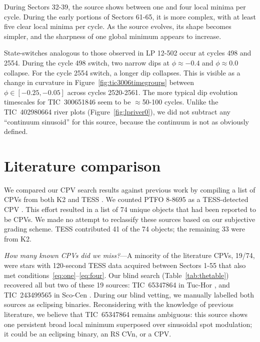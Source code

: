 \documentclass[11pt,twocolumn,tighten]{aastex63}
\begin{document}
During Sectors 32-39, the source shows between one and four local
minima per cycle.  During the early portions of Sectors 61-65, it is
more complex, with at least five clear local minima per
cycle.  As the source evolves, its shape becomes simpler, and the
sharpness of one global minimum appears to increase.

State-switches analogous to those observed in LP 12-502 occur at
cycles 498 and 2554.  During the cycle 498 switch, two narrow dips at
$\phi$$\approx$$-0.4$ and $\phi$$\approx$0.0 collapse.  For the cycle
2554 switch, a longer dip collapses.  This is visible as a change in
curvature in Figure~\ref{fig:tic3006timegroups} between $\phi \in
[-0.25, -0.05]$ across cycles 2520-2561.  The  more typical dip
evolution timescales for TIC~300651846 seem to be $\approx$50-100
cycles.  Unlike the TIC~402980664 river plots
(Figure~\ref{fig:lpriver0}), we did not subtract any ``continuum
sinusoid'' for this source, because the continuum is not as obviously
defined.


\section{Literature comparison}
\label{sec:litcomp}

We compared our CPV search results against previous work by
compiling a list of CPVs from both K2
\citep{2017AJ....153..152S,2018AJ....155...63S} and TESS
\citep{2019ApJ...876..127Z,2020AJ....160...86B,2021AJ....161...60S,2022AJ....163..144G,2023ApJ...945..114P}.
We counted PTFO 8-8695 as a TESS-detected CPV \citep[but see][and
references therein]{2020AJ....160...86B}.  This effort resulted in a
list of 74 unique objects that had been reported to be CPVs.  We made
no attempt to reclassify these sources based on our subjective grading
scheme.  TESS contributed 41 of the 74 objects; the remaining 33 were
from K2.  

{\it How many known CPVs did we miss?}---A minority of the literature
CPVs, 19/74, were stars with 120-second TESS data acquired between
Sectors 1-55 that also met conditions~\ref{eq:one}--\ref{eq:four}.
Our blind search (Table~\ref{tab:thetable}) recovered all but two of
these 19 sources: TIC~65347864 in Tuc-Hor \citep{2023ApJ...945..114P},
and TIC~243499565 in Sco-Cen \citep{2021AJ....161...60S}.  During our
blind vetting, we manually labelled both sources as eclipsing
binaries.  Reconsidering with the knowledge of previous literature, we
believe that TIC~65347864 remains ambiguous: this source shows one
persistent broad local minimum superposed over sinusoidal spot
modulation; it could be an eclipsing binary, an RS CVn, or a CPV.
\end{document}
